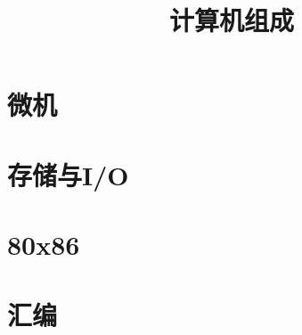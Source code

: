 \documentclass[10pt,a4paper]{article}
\begin{document}
	\begin{CJK}{UTF8}{song}
	\title{计算机组成}
	\date{}
	\begin{multicols}{3}
		\maketitle
		\section{微机}
		
		\section{存储与I/O}
		
		\section{80x86}
		
		\section{汇编}
		

\end{multicols}
\end{CJK}
\end{document}
